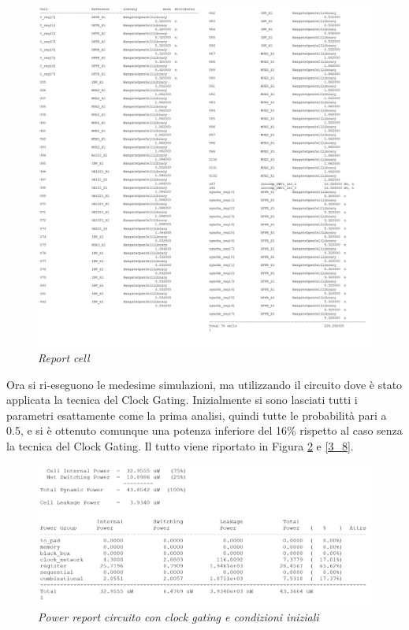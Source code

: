 \begin{figure}[!htb]
	\centering
	\includegraphics[scale=0.65]{immagini/3_6}
	\caption{\textit{Report cell}}
	\label{3_6}
\end{figure}
\newpage
Ora si ri-eseguono le medesime simulazioni, ma utilizzando il circuito dove è stato applicata la tecnica del Clock Gating. Inizialmente si sono lasciati tutti i parametri esattamente come la prima analisi, quindi tutte le probabilità pari a 0.5, e si è ottenuto comunque una potenza inferiore del 16\% rispetto al caso senza la tecnica del Clock Gating. Il tutto viene riportato in Figura \ref{3_7} e \ref{3_8}. \\
\begin{figure}[!htb]
	\centering
	\includegraphics[scale=0.5]{immagini/3_7}
	\caption{\textit{Power report circuito con clock gating e condizioni iniziali}}
	\label{3_7}
\end{figure}
